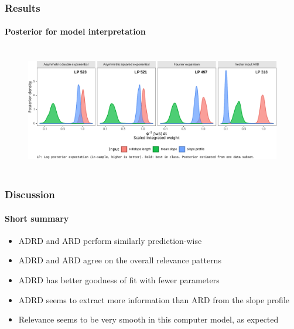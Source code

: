 \documentclass{snedecorbeamer}
\begin{document}
\begin{frame}
  \frametitle{Results}
  \framesubtitle{Posterior for model interpretation}

  \begin{figure}
    \centering
    \includegraphics[height=15em]{inc/wepp_weight_integral_mini.pdf}
  \end{figure}

\end{frame}

\begin{frame}
  \frametitle{Discussion}
  \framesubtitle{Short summary}

  \begin{itemize}
  \item ADRD and ARD perform similarly prediction-wise
  \item ADRD and ARD agree on the overall relevance patterns
  \item ADRD has better goodness of fit with fewer parameters
  \item ADRD seems to extract more information than ARD from the slope profile
  \item Relevance seems to be very smooth in this computer model, as expected
  \end{itemize}
\end{frame}
\end{document}
